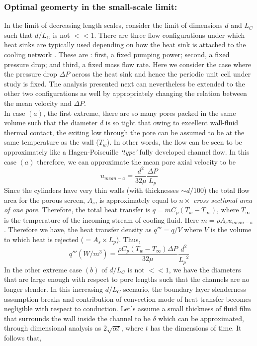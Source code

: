 \documentclass[twocolumn,10pt,cleanfoot]{ihmtc}
\begin{document}
\subsubsection*{Optimal geomerty in the small-scale limit:} In the limit of decreasing length scales, consider the limit of dimensions $ d $ and $ L_C $ such that $d/L_C$ is not $<< 1$. There are three flow configurations under which heat sinks are typically used depending on how the heat sink is attached to the cooling network \cite{14th from wen lu}. These are : first, a fixed pumping power; second, a fixed pressure drop; and third, a fixed mass flow rate. Here we consider the case where the pressure drop $ \Delta P $ across the heat sink and hence the periodic unit cell under study is fixed. The analysis presented next can nevertheless be extended to the other two configurations as well by appropriately changing the relation between the mean velocity and $\Delta P$.\\
%
In case $ (a) $, the first extreme, there are so many pores packed in the same volume such that the diameter $ d $ is so tight that owing to excellent wall-fluid thermal contact, the exiting low through the pore can be assumed to be at the same temperature as the wall ($ T_w $). In other words, the flow can be seen to be approximately like a Hagen-Poiseuille \emph{`type'} fully developed channel flow. In this case $ (a) $ therefore, we can approximate the mean pore axial velocity to be 
%
\[u_{mean-a}=\frac{{d}^{2}}{32\mu }\frac{\Delta P}{{L}_{p}}\]
%
Since the cylinders have very thin walls (with thicknesses $\sim d/100 $) the total flow area for the porous screen, $ A_s $, is approximately equal to $n \times$ {\it cross sectional area of one pore}. Therefore, the total heat transfer is $ q=\dot{m}C_p(T_w-T_\infty) $, where $ T_\infty $ is the temperature of the incoming stream of cooling fluid. Here $\dot{m}=\rho A_s u_{mean-a}$. Therefore we have, the heat transfer density as $ q''' =q/V$ where $ V $ is the volume to which heat is rejected ($ =A_s \times L_p$). Thus,
%
\begin{equation}\label{d0}
q'''({W}/{{m}^{3}})=\frac{\rho {{C}_{p}}(T_w-T_\infty)\Delta P}{32\mu }\frac{{{d}^{2}}}{{{L}_{p}}^{2}}
\end{equation}
%
In the other extreme case $ (b) $ of $d/L_C$ is not $<< 1$, we have the diameters that are large enough with respect to pore lengths such that the channels are no longer slender. In this increasing $d/L_C$ scenario, the boundary layer slenderness assumption breaks and contribution of convection mode of heat transfer becomes negligible with respect to conduction. Let's assume a small thickness of fluid film that surrounds the wall inside the channel to be $ \delta $ which can be approximated, through dimensional analysis as $ 2\sqrt{\alpha t} $, where $t$ has the dimensions of time. It follows that,
\end{document}
